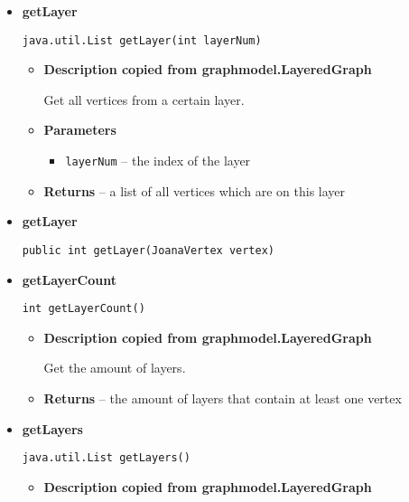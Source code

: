 {{{{{{{{{{{{{\begin{itemize}
{\begin{itemize}
{Returns the height, i.e. the number of layers.
}
\item{{\bf  Returns} -- 
the height 
}%
\end{itemize}
}%
\item{ 
{\bf  getLayer}\\
\begin{lstlisting}[frame=none]
java.util.List getLayer(int layerNum)\end{lstlisting} %
\begin{itemize}
\item{
{\bf  Description copied from graphmodel.LayeredGraph{\small {}} }

Get all vertices from a certain layer.
}
\item{
{\bf  Parameters}
  \begin{itemize}
   \item{
\texttt{layerNum} -- the index of the layer}
  \end{itemize}
}%
\item{{\bf  Returns} -- 
a list of all vertices which are on this layer 
}%
\end{itemize}
}%
\item{ 
{\bf  getLayer}\\
\begin{lstlisting}[frame=none]
public int getLayer(JoanaVertex vertex)\end{lstlisting} %
}%
\item{ 
{\bf  getLayerCount}\\
\begin{lstlisting}[frame=none]
int getLayerCount()\end{lstlisting} %
\begin{itemize}
\item{
{\bf  Description copied from graphmodel.LayeredGraph{\small {}} }

Get the amount of layers.
}
\item{{\bf  Returns} -- 
the amount of layers that contain at least one vertex 
}%
\end{itemize}
}%
\item{ 
{\bf  getLayers}\\
\begin{lstlisting}[frame=none]
java.util.List getLayers()\end{lstlisting} %
\begin{itemize}
\item{
{\bf  Description copied from graphmodel.LayeredGraph{\small {}} }

}
\end{itemize}}
\end{itemize}}}}}}}}}}}}}}
